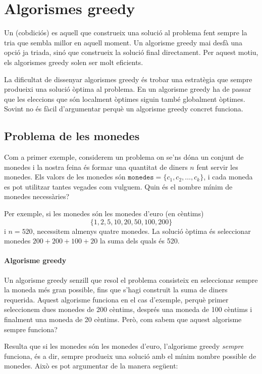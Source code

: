 \chapter{Algorismes greedy}


Un  (cobdiciós)
es aquell que construeix una solució al problema
fent sempre la tria que sembla
millor en aquell moment.
Un algorisme greedy mai desfà una opció
ja triada, sinó que construeix la solució
final directament.
Per aquest motiu, els algorismes greedy
solen ser molt eficients.

La dificultat de dissenyar algorismes greedy
és trobar una estratègia
que sempre produeixi una solució òptima
al problema.
En un algorisme greedy ha de passar que les eleccions
que són localment òptimes siguin també globalment òptimes.
Sovint no és fàcil d'argumentar perquè un algorisme greedy
concret funciona.

\section{Problema de les monedes}

Com a primer exemple, considerem un problema
on se'ns dóna un conjunt de monedes
i la nostra feina és formar una quantitat de diners $n$
fent servir les monedes.
Els valors de les monedes són
$\texttt{monedes}=\{c_1,c_2,\ldots,c_k\}$,
i cada moneda es pot utilitzar tantes vegades com vulguem.
Quin és el nombre mínim de monedes necessàries?

Per exemple, si les monedes són les monedes d'euro (en cèntims)
\[\{1,2,5,10,20,50,100,200\}\]
i $n=520$,
necessitem almenys quatre monedes.
La solució òptima és seleccionar monedes
$200+200+100+20$ la suma dels quals és 520.

\subsubsection{Algorisme greedy}

Un algorisme greedy senzill que resol el problema consisteix
en seleccionar sempre la moneda més gran possible,
fins que s'hagi construït la suma de diners requerida.
Aquest algorisme funciona en el cas d'exemple,
perquè primer seleccionem dues monedes de 200 cèntims,
després una moneda de 100 cèntims i finalment una moneda de 20 cèntims.
Però, com sabem que aquest algorisme sempre funciona?

Resulta que si les monedes són les monedes d'euro,
l'algorisme greedy \emph{sempre} funciona, és a dir,
sempre produeix una solució amb el mínim
nombre possible de monedes.
Això es pot argumentar de la manera següent:

